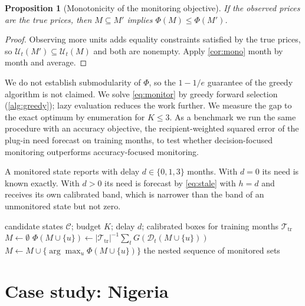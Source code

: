 \documentclass[preprint,12pt,number]{elsarticle}%
\newtheorem{proposition}{Proposition}
\theoremstyle{definition}
\theoremstyle{remark}
\newcommand{\U}{\mathcal{U}}
\begin{document}
\begin{proposition}[Monotonicity of the monitoring objective]\label{prop:monotone}
If the observed prices are the true prices, then $M\subseteq M'$ implies $\Phi(M)\le\Phi(M')$.
\end{proposition}

\begin{proof}
Observing more units adds equality constraints satisfied by the true prices, so $\U_t(M')\subseteq\U_t(M)$ and both are nonempty. Apply \cref{cor:mono} month by month and average.
\end{proof}

We do not establish submodularity of $\Phi$, so the $1-1/e$ guarantee of the greedy algorithm \citep{nemhauser1978analysis} is not claimed. We solve \eqref{eq:monitor} by greedy forward selection (\cref{alg:greedy}); lazy evaluation \citep{minoux1978accelerated} reduces the work further. We measure the gap to the exact optimum by enumeration for $K\le3$. As a benchmark we run the same procedure with an accuracy objective, the recipient-weighted squared error of the plug-in need forecast on training months, to test whether decision-focused monitoring outperforms accuracy-focused monitoring.

A monitored state reports with delay $d\in\{0,1,3\}$ months. With $d=0$ its need is known exactly. With $d>0$ its need is forecast by \eqref{eq:stale} with $h=d$ and receives its own calibrated band, which is narrower than the band of an unmonitored state but not zero.

\begin{algorithm}[t]
\caption{Greedy monitoring design}\label{alg:greedy}
\begin{algorithmic}[1]
\Require candidate states $\mathcal C$; budget $K$; delay $d$; calibrated boxes for training months $\mathcal T_{\mathrm{tr}}$
\State $M\gets\emptyset$
    \State $\Phi(M\cup\{u\})\gets|\mathcal T_{\mathrm{tr}}|^{-1}\sum_{t}G(\mathcal D_t(M\cup\{u\}))$ 
  \EndFor
  \State $M\gets M\cup\{\arg\max_u\Phi(M\cup\{u\})\}$
\EndFor
\State \Return the nested sequence of monitored sets
\end{algorithmic}
\end{algorithm}

\section{Case study: Nigeria}\label{sec:case}
\end{document}
